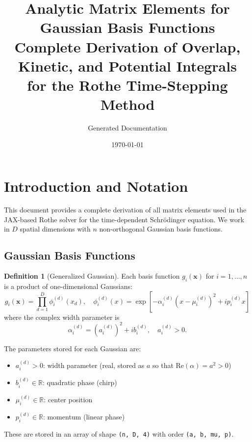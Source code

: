 \documentclass[11pt,a4paper]{article}
\title{\textbf{Analytic Matrix Elements for Gaussian Basis Functions}\\[0.5em]
\large Complete Derivation of Overlap, Kinetic, and Potential Integrals\\for the Rothe Time-Stepping Method}
\author{Generated Documentation}
\date{\today}
\newcommand{\re}{\mathrm{Re}}
\newcommand{\R}{\mathbb{R}}
\theoremstyle{definition}
\newtheorem{definition}{Definition}
\begin{document}
\maketitle
\tableofcontents
\newpage

\section{Introduction and Notation}

This document provides a complete derivation of all matrix elements used in the JAX-based Rothe solver for the time-dependent Schrödinger equation. We work in $D$ spatial dimensions with $n$ non-orthogonal Gaussian basis functions.

\subsection{Gaussian Basis Functions}

\begin{definition}[Generalized Gaussian]
Each basis function $g_i(\bm{x})$ for $i = 1, \ldots, n$ is a product of one-dimensional Gaussians:
\begin{equation}
\boxed{
g_i(\bm{x}) = \prod_{d=1}^{D} \phi_i^{(d)}(x_d), \quad
\phi_i^{(d)}(x) = \exp\left[ -\alpha_i^{(d)} (x - \mu_i^{(d)})^2 + i p_i^{(d)} x \right]
}
\end{equation}
where the complex width parameter is
\begin{equation}
\alpha_i^{(d)} = (a_i^{(d)})^2 + i b_i^{(d)}, \quad a_i^{(d)} > 0.
\end{equation}
\end{definition}

The parameters stored for each Gaussian are:
\begin{itemize}
    \item $a_i^{(d)} > 0$: width parameter (real, stored as $a$ so that $\re(\alpha) = a^2 > 0$)
    \item $b_i^{(d)} \in \R$: quadratic phase (chirp)
    \item $\mu_i^{(d)} \in \R$: center position
    \item $p_i^{(d)} \in \R$: momentum (linear phase)
\end{itemize}

These are stored in an array of shape \texttt{(n, D, 4)} with order \texttt{(a, b, mu, p)}.
\end{document}
